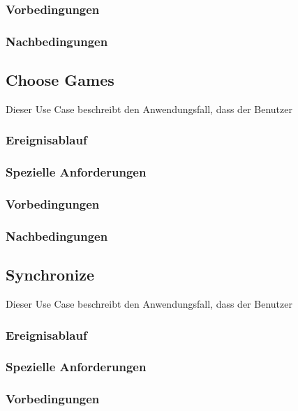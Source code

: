 		\subsubsection{Vorbedingungen}
			
		\subsubsection{Nachbedingungen}
	
	\subsection{Choose Games}
		Dieser Use Case beschreibt den Anwendungsfall, dass der Benutzer 
			
		\subsubsection{Ereignisablauf}
			
		\subsubsection{Spezielle Anforderungen}		
			
		\subsubsection{Vorbedingungen}
			
		\subsubsection{Nachbedingungen}
	
	\subsection{Synchronize}
		Dieser Use Case beschreibt den Anwendungsfall, dass der Benutzer 
			
		\subsubsection{Ereignisablauf}
			
		\subsubsection{Spezielle Anforderungen}		
			
		\subsubsection{Vorbedingungen}
			
